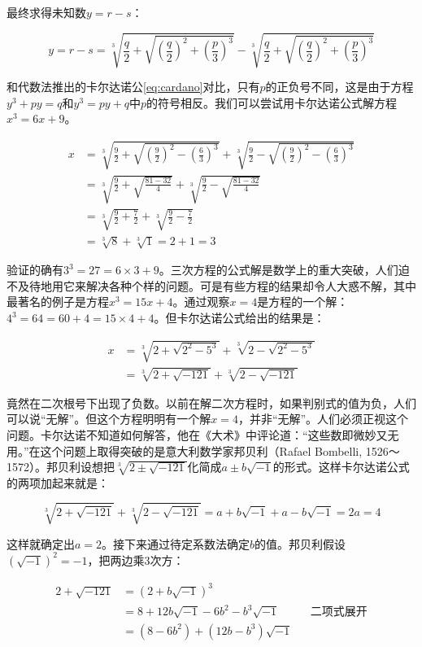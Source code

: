 \documentclass[b5paper]{ctexart}
\begin{document}
最终求得未知数$y = r - s$：

\[
y = r - s = \sqrt[3]{\frac{q}{2} + \sqrt{(\frac{q}{2})^2 + (\frac{p}{3})^3}} - \sqrt[3]{\frac{q}{2} + \sqrt{(\frac{q}{2})^2 + (\frac{p}{3})^3}}
\]

和代数法推出的卡尔达诺公\cref{eq:cardano}对比，只有$p$的正负号不同，这是由于方程$y^3 + py = q$和$y^3 = py + q$中$p$的符号相反。我们可以尝试用卡尔达诺公式解方程$x^3 = 6x + 9$。

\begin{align*}
x &= \sqrt[3]{\frac{9}{2} + \sqrt{(\frac{9}{2})^2 - (\frac{6}{3})^3}} + \sqrt[3]{\frac{9}{2} - \sqrt{(\frac{9}{2})^2 - (\frac{6}{3})^3}} \\
  &= \sqrt[3]{\frac{9}{2} + \sqrt{\frac{81 - 32}{4}}} + \sqrt[3]{\frac{9}{2} - \sqrt{\frac{81 - 32}{4}}} \\
  &= \sqrt[3]{\frac{9}{2} + \frac{7}{2}} + \sqrt[3]{\frac{9}{2} - \frac{7}{2}} \\
  &= \sqrt[3]{8} + \sqrt[3]{1} = 2 + 1 = 3
\end{align*}

验证的确有$3^3 = 27 = 6 \times 3 + 9$。三次方程的公式解是数学上的重大突破，人们迫不及待地用它来解决各种个样的问题。可是有些方程的结果却令人大惑不解，其中最著名的例子是方程$x^3 = 15x + 4$。通过观察$x = 4$是方程的一个解：$4^3= 64 = 60 + 4 = 15 \times 4 + 4$。但卡尔达诺公式给出的结果是：

\begin{align*}
x &= \sqrt[3]{2 + \sqrt{2^2 - 5^3}} + \sqrt[3]{2 - \sqrt{2^2 - 5^3}}  \\
  &= \sqrt[3]{2 + \sqrt{-121}} + \sqrt[3]{2 - \sqrt{-121}}
\end{align*}

竟然在二次根号下出现了负数。以前在解二次方程时，如果判别式的值为负，人们可以说“无解”。但这个方程明明有一个解$x = 4$，并非“无解”。人们必须正视这个问题。卡尔达诺不知道如何解答，他在《大术》中评论道：“这些数即微妙又无用。”在这个问题上取得突破的是意大利数学家邦贝利（Rafael Bombelli, 1526～1572）。邦贝利设想把$\sqrt[3]{2 \pm \sqrt{-121}}$化简成$a \pm b\sqrt{-1}$的形式。这样卡尔达诺公式的两项加起来就是：

\[
\sqrt[3]{2 + \sqrt{-121}} + \sqrt[3]{2 - \sqrt{-121}} = a + b\sqrt{-1} + a - b\sqrt{-1} = 2a = 4
\]

这样就确定出$a = 2$。接下来通过待定系数法确定$b$的值。邦贝利假设$(\sqrt{-1})^2 = -1$，把两边乘3次方：

\begin{align*}
2 + \sqrt{-121} &= (2 + b\sqrt{-1})^3 \\
  &= 8 + 12b\sqrt{-1} - 6b^2 - b^3\sqrt{-1} && \text{二项式展开} \\
  &= (8 - 6b^2) + (12b - b^3)\sqrt{-1}
\end{align*}
\end{document}
